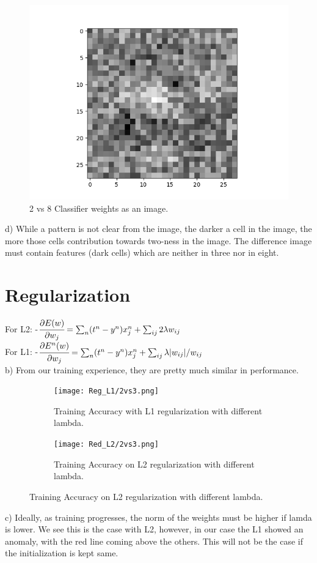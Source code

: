 \documentclass{article} %
\begin{document}
\begin{figure}[H]
\begin{center}
\includegraphics[width=0.5\linewidth]{2vs8.png}
\end{center}
\caption{2 vs 8 Classifier weights as an image.}
\end{figure}
d) While a pattern is not clear from the image, the darker a cell in the image, the more those cells contribution towards two-ness in the image. The difference image must contain features (dark cells) which are neither in three nor in eight.

\section{Regularization}

For L2:
-$\cfrac{\partial E(w)}{\partial w_j} = \sum_n(t^n-y^n)x^n_j + \sum_{ij}  2\lambda w_{ij}$\\
\hfill\break
For L1:   
-$\cfrac{\partial E^n(w)}{\partial w_j} = \sum_n(t^n-y^n)x^n_j + \sum_{ij} \lambda|w_{ij}|/w_{ij}$\\
      
b) From our training experience, they are pretty much similar in performance.
      
\begin{figure}[H]
\centering
\begin{subfigure}{.5\textwidth}
	\centering
	\texttt{[image: Reg\_L1/2vs3.png]}
	\caption{Training Accuracy with L1 regularization with different lambda.}
\end{subfigure}%
\begin{subfigure}{.5\textwidth}
    \centering
	\texttt{[image: Red\_L2/2vs3.png]}
	\caption{Training Accuracy on L2 regularization with different lambda.}
\end{subfigure}
\end{figure}

c) Ideally, as training progresses, the norm of the weights must be higher if lamda is lower. We see this is the case with L2, however, in our case the L1 showed an anomaly, with  the red line coming above the others. This will not be the case if the initialization is kept same.
     
\end{document}
